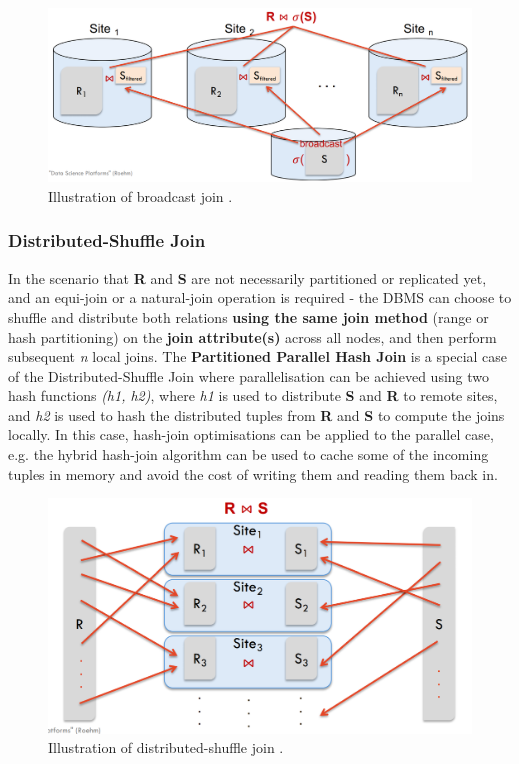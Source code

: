 \begin{figure}[h]
  \centering
  \includegraphics[width=\linewidth]{figures/broadcast-join.png}
  \caption{Illustration of broadcast join \cite{DATA3404Slides}.}
  \label{fig:broadcast-join}
\end{figure}

\subsubsection{Distributed-Shuffle Join}
In the scenario that \textbf{R} and \textbf{S} are not necessarily partitioned or replicated yet, and an equi-join or a natural-join operation is required - the DBMS can choose to shuffle and distribute both relations \textbf{using the same join method} (range or hash partitioning) on the \textbf{join attribute(s)} across all nodes, and then perform subsequent \textit{n} local joins. The \textbf{Partitioned Parallel Hash Join} is a special case of the Distributed-Shuffle Join where parallelisation can be achieved using two hash functions \textit{(h1, h2)}, where \textit{h1} is used to distribute \textbf{S} and \textbf{R} to remote sites, and \textit{h2} is used to hash the distributed tuples from \textbf{R} and \textbf{S} to compute the joins locally. In this case, hash-join optimisations can be applied to the parallel case, e.g. the hybrid hash-join algorithm can be used to cache some of the incoming tuples in memory and avoid the cost of writing them and reading them back in. 

\begin{figure}[h]
  \centering
  \includegraphics[width=\linewidth]{figures/shuffle-join.png}
  \caption{Illustration of distributed-shuffle join \cite{DATA3404Slides}.}
  \label{fig:shuffle-join}
\end{figure}


